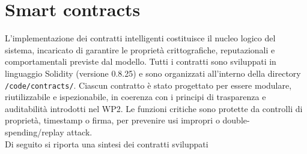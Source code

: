     \section{Smart contracts}
        L'implementazione dei contratti intelligenti costituisce il nucleo logico del sistema, incaricato di garantire le proprietà crittografiche, reputazionali e comportamentali previste dal modello. Tutti i contratti sono sviluppati in linguaggio Solidity (versione 0.8.25) e sono organizzati all'interno della directory \lstinline{/code/contracts/}. Ciascun contratto è stato progettato per essere modulare, riutilizzabile e ispezionabile, in coerenza con i principi di trasparenza e auditabilità introdotti nel WP2. Le funzioni critiche sono protette da controlli di proprietà, timestamp o firma, per prevenire usi impropri o double-spending/replay attack.\\
        Di seguito si riporta una sintesi dei contratti sviluppati
